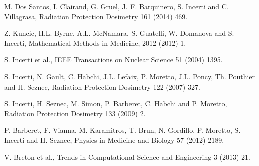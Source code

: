  M. Dos Santos, I. Clairand, G. Gruel, J. F. Barquinero, S. Incerti
                         and C. Villagrasa,
                         Radiation Protection Dosimetry 161 (2014) 469.

 Z. Kuncic, H.L. Byrne, A.L. McNamara, S. Guatelli, W. Domanova
                       and S. Incerti,
                       Mathematical Methods in Medicine, 2012 (2012) 1.

 S. Incerti et al., 
                        IEEE Transactions on Nuclear Science 51 (2004) 1395.


 S. Incerti, N. Gault, C. Habchi, J.L. Lefaix, P. Moretto, J.L. Poncy,
                        Th. Pouthier and H. Seznec,
                        Radiation Protection Dosimetry 122 (2007) 327.

 S. Incerti, H. Seznec, M. Simon, P. Barberet, C. Habchi and P. Moretto,
                        Radiation Protection Dosimetry 133 (2009) 2.

 P. Barberet, F. Vianna, M. Karamitros, T. Brun, N. Gordillo, P. Moretto,
                        S. Incerti and H. Seznec, 
                        Physics in Medicine and Biology 57 (2012) 2189.

 V. Breton et al.,
                        Trends in Computational Science and Engineering 3 (2013) 21.

